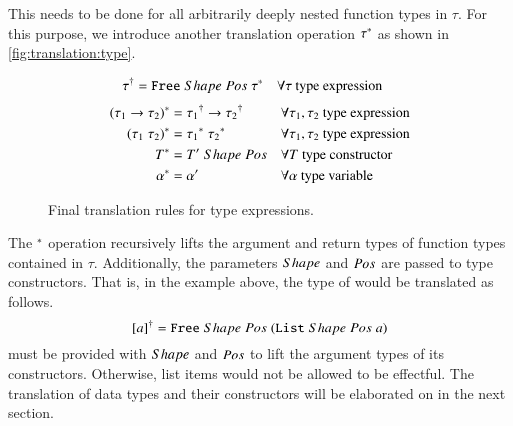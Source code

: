 This needs to be done for all arbitrarily deeply nested function types in $\tau$.
For this purpose, we introduce another translation operation ${\tau}^{*}$ as shown in \autoref{fig:translation:type}.
\begin{figure}[H]
  \begin{align}
       {\tau}^{\dagger}
    &= {\texttt{Free}}\;Shape\;Pos\;{{\tau}^{*}}
    && \forall \tau \text{ type expression}
       \label{eqn:translation:type}
  \end{align}
  \begin{align}
       {(\tau_1 \rightarrow \tau_2)}^{*}
    &= {\tau_1}^{\dagger} \rightarrow {\tau_2}^{\dagger}
    && \forall \tau_1, \tau_2 \text{ type expression}
       \label{eqn:translation:type:function}
    \\
       {(\tau_1\;\tau_2)}^{*}
    &= {\tau_1}^{*}\;{\tau_2}^{*}
    && \forall \tau_1, \tau_2 \text{ type expression}
       \label{eqn:translation:type:application}
    \\
       {T}^{*}
    &= {T'}\;Shape\;Pos
    && \forall T \text{ type constructor}
       \label{eqn:translation:type:constructor}
    \\
    {\alpha}^{*}
    &= \alpha'
    && \forall \alpha \text{ type variable}
       \label{eqn:translation:type:variable}
  \end{align}
  \caption{Final translation rules for type expressions.}
  \label{fig:translation:type}
\end{figure}

The ${}^{*}$ operation recursively lifts the argument and return types of function types contained in $\tau$.
Additionally, the parameters $Shape$ and $Pos$ are passed to type constructors.
That is, in the example above, the type of  would be translated as follows.
\[
  {[a]}^{\dagger} = {\texttt{Free}}\;Shape\;Pos\;{({\texttt{List}}\;Shape\;Pos\;a)}
\]
 must be provided with $Shape$ and $Pos$ to lift the argument types of its constructors.
Otherwise, list items would not be allowed to be effectful.
The translation of data types and their constructors will be elaborated on in the next section.
